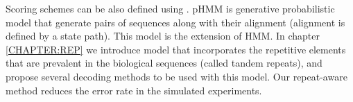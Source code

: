 Scoring schemes can be also defined using .  pHMM is generative probabilistic model that generate pairs of
sequences along with their alignment (alignment is defined by a state path).
This model is the extension of HMM. In chapter \ref{CHAPTER:REP} we introduce
model that incorporates the repetitive elements that are prevalent in the
biological sequences (called tandem repeats), and propose several decoding
methods to be used with this model. Our repeat-aware method reduces the error
rate in the simulated experiments. 


\begin{comment}
\begin{reformulate*}
Co vlastne chcem povedat
\begin{itemize}[itemsep=-1mm]
\item Chcem mat uvod ako aj pre niekoho kto nerozumie nicomu z biologie
\item ako aj pre niekoho kto nerozumie vela z informatiky
\item Uvod do zakladnych veci, ako dna, sekvencia, baza, mozno evolucia
\item Co vlastne v tejto praci je -- co sme spravili, co sme vylepsili a podobne
\item Ako vyzera struktura prace
\item Oznacenia?
\end{itemize}
\end{reformulate*}

\begin{reformulate*}
vieme dat pomlcky tak, aby sme maximalizovali pocet zhod na rovnakom mieste.
Napriklad pre vstupne sekcencie....

Rovnako vieme pouzit edit distance, pripadne skorovat substitucie rozne, a pridat aj medzery.
Taketo skorovacie schemy sa pouzivaju a funguju prekvapujuco dobre, ale stale obsahuju 
chyby lebo biologia je ovela komplikovanejsia. Tieto schemy vedia byt vyjadreme pomocou 
pHMM, ktore generuju dvojice sekvencii (a zaroven zarvonanie) a pri dekodovani sa
snazime tento proces reverznut. Avsak tieto casti nam umoznuju zakomponovat do
modelu dalsie evolucne operacie, cim sa spresni zarovnanie.
Rovnako mozeme vybrat vhodny dekodovaci algoritmus.

V tejto praci sme sa zamerali na tandemove repeaty, ktorych je v DNA vela a sposobuju problemy pri zarovnavani.
Navrhli sme model, ako aj dekodovacie ktoeria, ktore skvalitnili zarovnania.

Bilogicke:
Co je DNA, ako vyzera, co je evolucia -- ako to vyzera
ake operacie sa tam zhruba deju, preco pouzivame taketo skorovacie schemy.
Co su repeaty, geny a podobne.
\end{reformulate*}


\end{comment}
